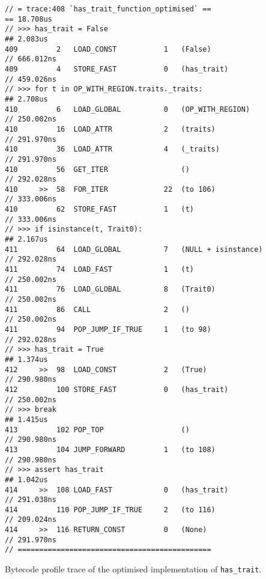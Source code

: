 \begin{code}
\begin{verbatim}
// = trace:408 `has_trait_function_optimised` ==                      == 18.708us
// >>> has_trait = False                                              ## 2.083us
409         2   LOAD_CONST           1   (False)                      // 666.012ns
409         4   STORE_FAST           0   (has_trait)                  // 459.026ns
// >>> for t in OP_WITH_REGION.traits._traits:                        ## 2.708us
410         6   LOAD_GLOBAL          0   (OP_WITH_REGION)             // 250.002ns
410         16  LOAD_ATTR            2   (traits)                     // 291.970ns
410         36  LOAD_ATTR            4   (_traits)                    // 291.970ns
410         56  GET_ITER                 ()                           // 292.028ns
410     >>  58  FOR_ITER             22  (to 106)                     // 333.006ns
410         62  STORE_FAST           1   (t)                          // 333.006ns
// >>> if isinstance(t, Trait0):                                      ## 2.167us
411         64  LOAD_GLOBAL          7   (NULL + isinstance)          // 292.028ns
411         74  LOAD_FAST            1   (t)                          // 250.002ns
411         76  LOAD_GLOBAL          8   (Trait0)                     // 250.002ns
411         86  CALL                 2   ()                           // 250.002ns
411         94  POP_JUMP_IF_TRUE     1   (to 98)                      // 292.028ns
// >>> has_trait = True                                               ## 1.374us
412     >>  98  LOAD_CONST           2   (True)                       // 290.980ns
412         100 STORE_FAST           0   (has_trait)                  // 250.002ns
// >>> break                                                          ## 1.415us
413         102 POP_TOP                  ()                           // 290.980ns
413         104 JUMP_FORWARD         1   (to 108)                     // 290.980ns
// >>> assert has_trait                                               ## 1.042us
414     >>  108 LOAD_FAST            0   (has_trait)                  // 291.038ns
414         110 POP_JUMP_IF_TRUE     2   (to 116)                     // 209.024ns
414     >>  116 RETURN_CONST         0   (None)                       // 291.970ns
// =============================================
    \end{verbatim}
    \caption{Bytecode profile trace of the optimised implementation of \texttt{has_trait}.}
    \label{listing:bytecode-profiles-hastrait-optimised}
\end{code}



